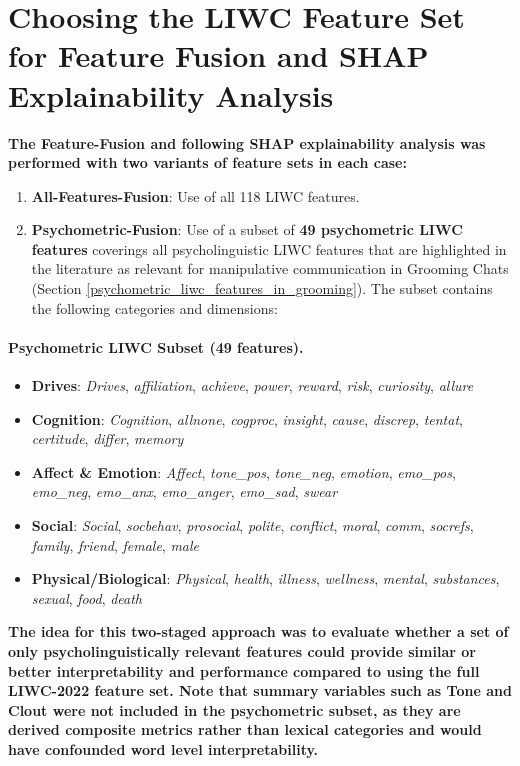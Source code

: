 \section{Choosing the LIWC Feature Set for Feature Fusion and SHAP Explainability Analysis} \label{sec:liwc-feature-selection}



\textbf{The Feature-Fusion and following SHAP explainability analysis was performed with two variants of feature sets in each case: }
\begin{enumerate}
    \item \textbf{All-Features-Fusion}: Use of all 118 LIWC features.
    \item \textbf{Psychometric-Fusion}: Use of a subset of \textbf{49 psychometric LIWC features} coverings all psycholinguistic LIWC features that are highlighted in the literature as relevant for manipulative communication in Grooming Chats (Section \ref{psychometric_liwc_features_in_grooming}). The subset contains the following categories and dimensions:
\end{enumerate}

\paragraph{Psychometric LIWC Subset (49 features).}
\begin{itemize}
  \item \textbf{Drives}: \textit{Drives}, \textit{affiliation}, \textit{achieve}, \textit{power}, \textit{reward}, \textit{risk}, \textit{curiosity}, \textit{allure}
  \item \textbf{Cognition}: \textit{Cognition}, \textit{allnone}, \textit{cogproc}, \textit{insight}, \textit{cause}, \textit{discrep}, \textit{tentat}, \textit{certitude}, \textit{differ}, \textit{memory}
  \item \textbf{Affect \& Emotion}: \textit{Affect}, \textit{tone\_pos}, \textit{tone\_neg}, \textit{emotion}, \textit{emo\_pos}, \textit{emo\_neg}, \textit{emo\_anx}, \textit{emo\_anger}, \textit{emo\_sad}, \textit{swear}
  \item \textbf{Social}: \textit{Social}, \textit{socbehav}, \textit{prosocial}, \textit{polite}, \textit{conflict}, \textit{moral}, \textit{comm}, \textit{socrefs}, \textit{family}, \textit{friend}, \textit{female}, \textit{male}
  \item \textbf{Physical/Biological}: \textit{Physical}, \textit{health}, \textit{illness}, \textit{wellness}, \textit{mental}, \textit{substances}, \textit{sexual}, \textit{food}, \textit{death}
\end{itemize}
\textbf{The idea for this two-staged approach was to evaluate whether a set of only psycholinguistically relevant features could provide similar or better interpretability and performance compared to using the full LIWC-2022 feature set. Note that summary variables such as Tone and Clout were not included in the psychometric subset, as they are derived composite metrics rather than lexical categories and would have confounded word level interpretability. } 


